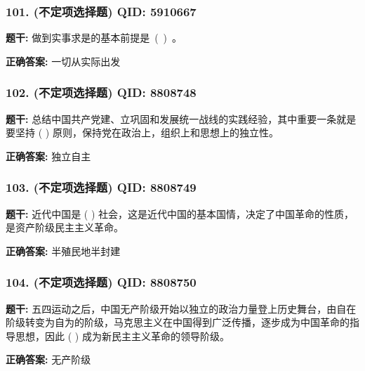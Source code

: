 \documentclass[12pt,UTF8]{ctexart}
\begin{document}
\subsubsection*{101. (不定项选择题) \small QID: 5910667}

\textbf{题干:}
做到实事求是的基本前提是 ( ) 。

\textbf{正确答案:}
一切从实际出发

\vspace{0.3em}\hrulefill\vspace{0.7em}

\subsubsection*{102. (不定项选择题) \small QID: 8808748}

\textbf{题干:}
总结中国共产党建、立巩固和发展统一战线的实践经验，其中重要一条就是要坚持 ( ) 原则，保持党在政治上，组织上和思想上的独立性。

\textbf{正确答案:}
独立自主

\vspace{0.3em}\hrulefill\vspace{0.7em}

\subsubsection*{103. (不定项选择题) \small QID: 8808749}

\textbf{题干:}
近代中国是 ( ) 社会，这是近代中国的基本国情，决定了中国革命的性质，是资产阶级民主主义革命。

\textbf{正确答案:}
半殖民地半封建

\vspace{0.3em}\hrulefill\vspace{0.7em}

\subsubsection*{104. (不定项选择题) \small QID: 8808750}

\textbf{题干:}
五四运动之后，中国无产阶级开始以独立的政治力量登上历史舞台，由自在阶级转变为自为的阶级，马克思主义在中国得到广泛传播，逐步成为中国革命的指导思想，因此 ( ) 成为新民主主义革命的领导阶级。

\textbf{正确答案:}
无产阶级

\vspace{0.3em}\hrulefill\vspace{0.7em}
\end{document}
